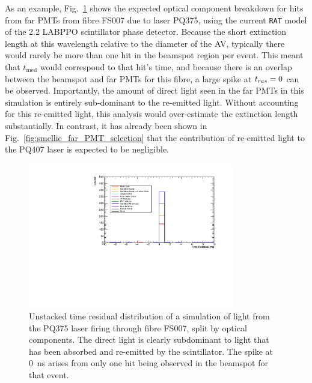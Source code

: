 As an example, Fig.~\ref{fig:smellie_PQ375_far_pmts_components} shows the expected optical component breakdown for hits from far PMTs from fibre FS007 due to laser PQ375, using the current \texttt{RAT} model of the \SI{2.2}{\gpl} LABPPO scintillator phase detector. Because the short extinction length at this wavelength relative to the diameter of the AV, typically there would rarely be more than one hit in the beamspot region per event. This meant that $t_{\mathrm{med}}$ would correspond to that hit's time, and because there is an overlap between the beamspot and far PMTs for this fibre, a large spike at $t_{res}{} = 0$ can be observed. Importantly, the amount of direct light seen in the far PMTs in this simulation is entirely sub-dominant to the re-emitted light. Without accounting for this re-emitted light, this analysis would over-estimate the extinction length substantially. In contrast, it has already been shown in Fig.~\ref{fig:smellie_far_PMT_selection} that the contribution of re-emitted light to the PQ407 laser is expected to be negligible.

\begin{figure}
    \centering
    \includegraphics[width=0.8\textwidth]{5_SMELLIEAnalysis/images/far_pmts_tres_plot_FS007_PQ375.pdf}
    \caption[Unstacked time residual distribution of a simulation of light from the PQ375 laser firing through fibre FS007, split by optical components]
    {Unstacked time residual distribution of a simulation of light from the PQ375 laser firing through fibre FS007, split by optical components. The direct light is clearly subdominant to light that has been absorbed and re-emitted by the scintillator. The spike at \SI{0}{\ns} arises from only one hit being observed in the beamspot for that event.}
    \label{fig:smellie_PQ375_far_pmts_components}
\end{figure}

